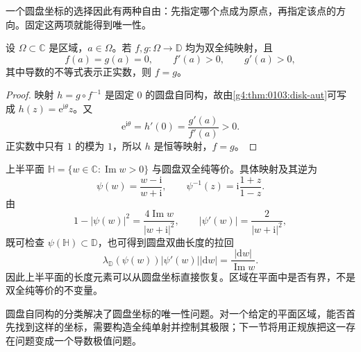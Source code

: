 一个圆盘坐标的选择因此有两种自由：先指定哪个点成为原点，再指定该点的方向。固定这两项就能得到唯一性。

\begin{corollary}
	\label{g4:cor:0103:normalized-unique}
	设 \(\Omega\subset\mathbb C\) 是区域，\(a\in\Omega\)。若 \(f,g\colon\Omega\rightarrow\mathbb D\) 均为双全纯映射，且
	\[
		f(a)=g(a)=0,\qquad f'(a)>0,\qquad g'(a)>0,
	\]
	其中导数的不等式表示正实数，则 \(f=g\)。
\end{corollary}

\begin{proof}
	映射 \(h=g\circ f^{-1}\) 是固定 \(0\) 的圆盘自同构，故由\cref{g4:thm:0103:disk-aut}可写成 \(h(z)=\mathrm{e}^{\mathrm{i}\theta}z\)。又
	\[
		\mathrm{e}^{\mathrm{i}\theta}=h'(0)=\frac{g'(a)}{f'(a)}>0.
	\]
	正实数中只有 \(1\) 的模为 \(1\)，所以 \(h\) 是恒等映射，\(f=g\)。
\end{proof}

\begin{example}
	\label{g4:exm:0103:half-plane}
	上半平面 \(\mathbb H=\{w\in\mathbb C:\operatorname{Im}w>0\}\) 与圆盘双全纯等价。具体映射及其逆为
	\[
		\psi(w)=\frac{w-\mathrm{i}}{w+\mathrm{i}},
		\qquad \psi^{-1}(z)=\mathrm{i}\frac{1+z}{1-z}.
	\]
	由
	\[
		1-\lvert\psi(w)\rvert^2
		=\frac{4\operatorname{Im}w}{\lvert w+\mathrm{i}\rvert^2},
		\qquad \lvert\psi'(w)\rvert=\frac2{\lvert w+\mathrm{i}\rvert^2},
	\]
	既可检查 \(\psi(\mathbb H)\subset\mathbb D\)，也可得到圆盘双曲长度的拉回
	\[
		\lambda_{\mathbb D}(\psi(w))\lvert\psi'(w)\rvert\lvert\mathrm{d}w\rvert
		=\frac{\lvert\mathrm{d}w\rvert}{\operatorname{Im}w}.
	\]
	因此上半平面的长度元素可以从圆盘坐标直接恢复。区域在平面中是否有界，不是双全纯等价的不变量。
\end{example}

圆盘自同构的分类解决了圆盘坐标的唯一性问题。对一个给定的平面区域，能否首先找到这样的坐标，需要构造全纯单射并控制其极限；下一节将用正规族把这一存在问题变成一个导数极值问题。
